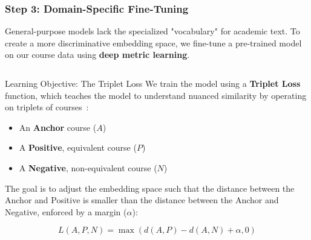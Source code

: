 \documentclass[aspectratio=169,10pt]{beamer}
\begin{document}
\begin{frame}
    \frametitle{Step 3: Domain-Specific Fine-Tuning}
    
    General-purpose models lack the specialized "vocabulary" for academic text. To create a more discriminative embedding space, we fine-tune a pre-trained model on our course data using \textbf{deep metric learning}.
    
    \fontsize{9}{9}\selectfont
    \begin{columns}[T]
        \begin{column}{0.55\textwidth}
            \begin{alertblock}{Learning Objective: The Triplet Loss}
                We train the model using a \textbf{Triplet Loss} function, which teaches the model to understand nuanced similarity by operating on triplets of courses~\cite{Schroff_2015_CVPR, hermans2017defensetripletlossperson}:
                \begin{itemize}
                    \item An \textbf{Anchor} course (\(A\))
                    \item A \textbf{Positive}, equivalent course (\(P\))
                    \item A \textbf{Negative}, non-equivalent course (\(N\))
                \end{itemize}
                
                \vspace{0.5em}
                The goal is to adjust the embedding space such that the distance between the Anchor and Positive is smaller than the distance between the Anchor and Negative, enforced by a margin (\(\alpha\)):
                
                \[ L(A, P, N) = \max\left(d(A, P) - d(A, N) + \alpha, 0\right) \]
            \end{alertblock}
        \end{column}
        

\end{columns}
\end{frame}
\end{document}
